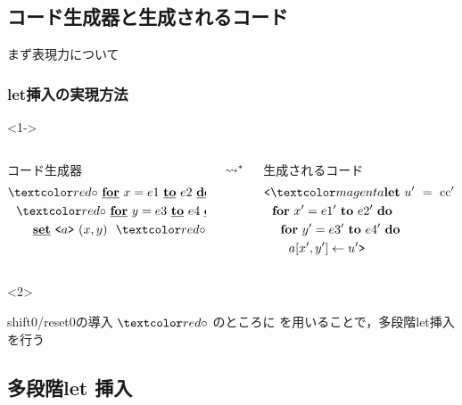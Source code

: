 \subsection{コード生成器と生成されるコード}

\begin{frame}
  \center
  \huge{まず表現力について}
\end{frame}

\begin{frame}
  \frametitle{let挿入の実現方法}

  \begin{visibleenv}<1->
    \begin{columns}
      \begin{column}{0.5\textwidth}%
        コード生成器
        \begin{align*}
          & \red{\circ}~ \cfordo{x = e1}{e2} \\
          & ~~\red{\circ}~ \cfordo{y = e3}{e4} \\
          & ~~~~~~\caryset{\code{a}}{(x,y)}~ \red{\circ}~ \text{cc}
        \end{align*}
      \end{column}
      $\leadsto^*$
      \begin{column}{0.5\textwidth}%
        生成されるコード
        \begin{align*}
          & \cbra \magenta{\Let ~u' ~= ~\text{cc}' ~\In} \\
          & ~~\fordo{x' = e1'}{e2'} \\
          & ~~~~\fordo{y' = e3'}{e4'} \\
          & ~~~~~~\aryset{a}{x',y'}{u'} \cket
        \end{align*}
      \end{column}
    \end{columns}
  \end{visibleenv}

  \begin{visibleenv}<2>
    \begin{exampleblock}{shift0/reset0の導入}
      $\red{\circ}$ のところに  を用いることで，多段階let挿入を行う
    \end{exampleblock}
  \end{visibleenv}
\end{frame}

\subsection{多段階let 挿入}

